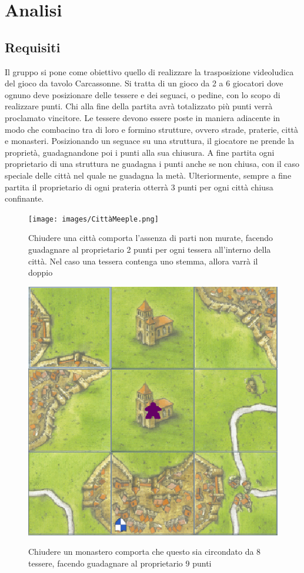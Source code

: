 \section{Analisi}
\subsection{Requisiti}

Il gruppo si pone come obiettivo quello di realizzare la trasposizione videoludica del gioco da tavolo Carcassonne. Si tratta di un gioco da 2 a 6 giocatori dove ognuno deve posizionare delle tessere e dei seguaci, o pedine, con lo scopo di realizzare punti. Chi alla fine della partita avrà totalizzato più punti verrà proclamato vincitore. Le tessere devono essere poste in maniera adiacente in modo che combacino tra di loro e formino strutture, ovvero strade, praterie, città e monasteri. Posizionando un seguace su una struttura, il giocatore ne prende la proprietà, guadagnandone poi i punti alla sua chiusura. A fine partita ogni proprietario di una struttura ne guadagna i punti anche se non chiusa, con il caso speciale delle città nel quale ne guadagna la metà. Ulteriormente, sempre a fine partita il proprietario di ogni prateria otterrà 3 punti per ogni città chiusa confinante.

\begin{figure}[hb]
    {\texttt{[image: images/CittàMeeple.png]}}

    \caption{Chiudere una città comporta l’assenza di parti non murate, facendo guadagnare al proprietario 2 punti per ogni tessera all'interno della città. Nel caso una tessera contenga uno stemma, allora varrà il doppio}
\end{figure}

\begin{figure}[hb]
    {\includegraphics[]{images/MonasteroMeeple.png}}

    \caption{Chiudere un monastero comporta che questo sia circondato da 8 tessere, facendo guadagnare al proprietario 9 punti}
\end{figure}


